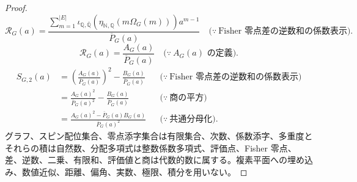 \documentclass[11pt,a4paper]{article}
\theoremstyle{remark}
\begin{document}
\begin{proof}
\[\mathcal R_G(a)
=
\frac{
  \displaystyle
  \sum_{m=1}^{|E|}
  \iota_{\mathbb Q,\overline{\mathbb Q}}\!\left(
    \eta_{\mathbb N,\mathbb Q}\!\left(m\Omega_G(m)\right)
  \right)
  a^{m-1}
}{
  \overline P_G(a)
}
\quad\bigl(\because\ \text{Fisher 零点差の逆数和の係数表示}\bigr).\]
\[\mathcal R_G(a)
=
\frac{
  A_G(a)
}{
  \overline P_G(a)
}
\quad\bigl(\because\ A_G(a)\text{ の定義}\bigr).\]
\[\begin{aligned}
S_{G,2}(a)
&=
\left(\frac{A_G(a)}{\overline P_G(a)}\right)^2
-
\frac{B_G(a)}{\overline P_G(a)}
&&\bigl(\because\ \text{Fisher 零点差の逆数和の係数表示}\bigr)\\
&=
\frac{A_G(a)^2}{\overline P_G(a)^2}
-
\frac{B_G(a)}{\overline P_G(a)}
&&\bigl(\because\ \text{商の平方}\bigr)\\
&=
\frac{A_G(a)^2-\overline P_G(a)B_G(a)}{\overline P_G(a)^2}
&&\bigl(\because\ \text{共通分母化}\bigr).
\end{aligned}\]
グラフ、スピン配位集合、零点添字集合は有限集合、次数、係数添字、多重度とそれらの積は自然数、分配多項式は整数係数多項式、評価点、Fisher 零点、差、逆数、二乗、有限和、評価値と商は代数的数に属する。複素平面への埋め込み、数値近似、距離、偏角、実数、極限、積分を用いない。

\end{proof}
\end{document}
